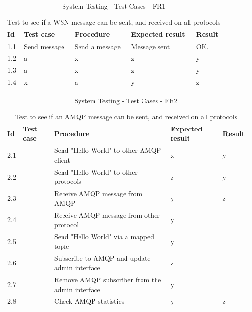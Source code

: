 \begin{table}[ht!]
\begin{tabular}{|m{1cm}|m{2cm}|m{4cm}|m{3cm}|m{1cm}|}
\hline
\rowcolor{lightgray}
\multicolumn{5}{|c|}{\textbf{FR1, WSN}} \\ \hline
\multicolumn{5}{|c|}{{Test to see if a WSN message can be sent, and received on all protocols}} \\ \hline
\textbf{Id} & \textbf{Test case} & \textbf{Procedure} & \textbf{Expected result} & \textbf{Result} \\ \hline
1.1 & Send message & Send a message & Message sent & OK. \\ \hline
1.2 &a&x&z&y \\ \hline
1.3&a&x&z&y \\ \hline
1.4&x&a&y&z \\ \hline
\end{tabular}
\caption{System Testing - Test Cases - FR1}
\label{table:system-testing-cases-fr1}
\end{table}

\begin{table}[ht!]
\begin{tabular}{|m{1cm}|m{2cm}|m{4cm}|m{3cm}|m{1cm}|}
\hline
\rowcolor{lightgray}
\multicolumn{5}{|c|}{\textbf{FR2, AMQP}} \\ \hline
\multicolumn{5}{|c|}{{Test to see if an AMQP message can be sent, and received on all protocols}} \\ \hline
\textbf{Id} & \textbf{Test case} & \textbf{Procedure} & \textbf{Expected result} & \textbf{Result} \\ \hline
2.1 &&Send "Hello World" to other AMQP client & x & y \\ \hline
2.2 &&Send "Hello World" to other protocols &z&y \\ \hline
2.3 &&Receive AMQP message from AMQP &y&z \\ \hline
2.4 &&Receive AMQP message from other protocol &y& \\ \hline
2.5 &&Send "Hello World" via a mapped topic &y& \\ \hline
2.6 &&Subscribe to AMQP and update admin interface &z& \\ \hline
2.7 &&Remove AMQP subscriber from the admin interface &y& \\ \hline
2.8 &&Check AMQP statistics &y&z \\ \hline
\end{tabular}
\caption{System Testing - Test Cases - FR2}
\label{table:system-testing-cases-fr2}
\end{table}

